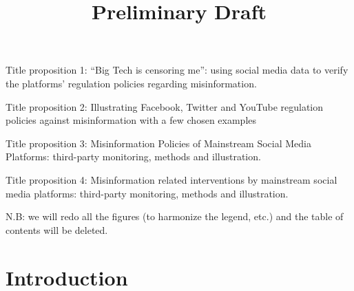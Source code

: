 \documentclass{article}
\begin{document}
\title{Preliminary Draft}

\maketitle

Title proposition 1: ``Big Tech is censoring me'': using social media data to verify the platforms' regulation policies regarding misinformation. 

Title proposition 2: Illustrating Facebook, Twitter and YouTube regulation policies against misinformation with a few chosen examples

Title proposition 3: Misinformation Policies of Mainstream Social Media Platforms: third-party monitoring, methods and illustration.

Title proposition 4: Misinformation related interventions by mainstream social media platforms: third-party monitoring, methods and illustration.

\smallskip

{\color{pink} \noindent N.B: we will redo all the figures (to harmonize the legend, etc.) and the table of contents will be deleted.} 
\tableofcontents

\section{Introduction}
\end{document}
